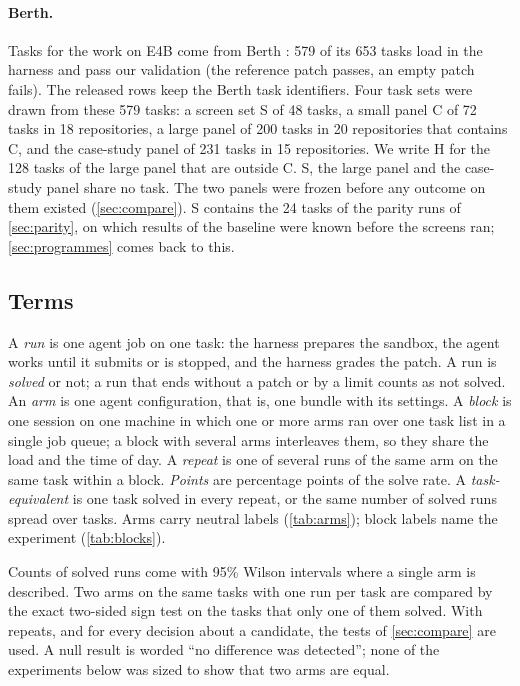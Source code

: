 \paragraph{Berth.} Tasks for the work on E4B come from Berth \citep{patel2026berth}: 579 of its 653 tasks load in the
harness and pass our validation (the reference patch passes, an empty patch fails). The released rows keep the Berth
task identifiers. Four task sets were drawn from these 579 tasks: a screen set S of 48 tasks, a small panel C of 72 tasks in 18 repositories, a large panel of 200 tasks
in 20 repositories that contains C, and the case-study panel of 231 tasks in 15 repositories. We write H for the 128
tasks of the large panel that are outside C. S, the large panel and the case-study panel share no task. The two panels were frozen before any outcome on them
existed (\cref{sec:compare}). S contains the 24 tasks of the parity runs of \cref{sec:parity}, on which results of the
baseline were known before the screens ran; \cref{sec:programmes} comes back to this.

\subsection{Terms}

A \emph{run} is one agent job on one task: the harness prepares the sandbox, the agent works until it submits or is
stopped, and the harness grades the patch. A run is \emph{solved} or not; a run that ends without a patch or by a limit
counts as not solved. An \emph{arm} is one agent configuration, that is, one bundle with its settings. A \emph{block}
is one session on one machine in which one or more arms ran over one task list in a single job queue; a block with
several arms interleaves them, so they share the load and the time of day. A \emph{repeat} is one of several runs of
the same arm on the same task within a block. \emph{Points} are percentage points of the solve rate. A
\emph{task-equivalent} is one task solved in every repeat, or the same number of solved runs spread over tasks.
Arms carry neutral labels (\cref{tab:arms}); block labels name the experiment (\cref{tab:blocks}).

Counts of solved runs come with 95\% Wilson intervals where a single arm is described. Two arms on the same tasks
with one run per task are compared by the exact two-sided sign test on the tasks that only one of them solved. With
repeats, and for every decision about a candidate, the tests of \cref{sec:compare} are used. A null result is worded
``no difference was detected''; none of the experiments below was sized to show that two arms are equal.

